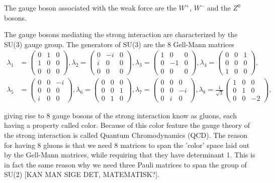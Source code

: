 The gauge boson associated with the weak force are the $W^+$, $W^-$ and the $Z^0$ bosons.

The gauge bosons mediating the strong interaction are characterized by the SU(3) gauge group. The generators of SU(3) are the 8 Gell-Mann matrices
\begin{align} \label{eq:gellmannmatrices}
	\lambda_1 &= \begin{pmatrix} 0 & 1 & 0 \\ 1 & 0 & 0 \\ 0 & 0 & 0 \end{pmatrix},
	\lambda_2 = \begin{pmatrix} 0 & -i & 0 \\ i & 0 & 0 \\ 0 & 0 & 0 \end{pmatrix},
	\lambda_3 = \begin{pmatrix} 1 & 0 & 0 \\ 0 & -1 & 0 \\ 0 & 0 & 0 \end{pmatrix},
	\lambda_4 = \begin{pmatrix} 0 & 0 & 1 \\ 0 & 0 & 0 \\ 1 & 0 & 0 \end{pmatrix}, \nonumber \\
	\lambda_5 &= \begin{pmatrix} 0 & 0 & -i \\ 0 & 0 & 0 \\ i & 0 & 0 \end{pmatrix},
	\lambda_6 = \begin{pmatrix} 0 & 0 & 0 \\ 0 & 0 & 1 \\ 0 & 1 & 0 \end{pmatrix},
	\lambda_7 = \begin{pmatrix} 0 & 0 & 0 \\ 0 & 0 & -i \\ 0 & i & 0 \end{pmatrix},
	\lambda_8 = \frac{1}{\sqrt{3}} \begin{pmatrix} 1 & 0 & 0 \\ 0 & 1 & 0 \\ 0 & 0 & -2 \end{pmatrix},
\end{align}

giving rise to 8 gauge bosons of the strong interaction know as gluons, each having a property called color. Because of this color feature the gauge theory of the strong interaction is called Quantum Chromodynamics (QCD). The reason for having 8 gluons is that we need 8 matrices to span the 'color' space laid out by the Gell-Mann matrices, while requiring that they have determinant 1. This is in fact the same reason why we need three Pauli matrices to span the group of SU(2) [KAN MAN SIGE DET, MATEMATISK?].

